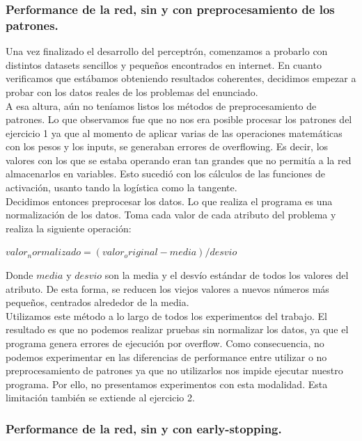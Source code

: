 \subsubsection{Performance de la red, sin y con preprocesamiento de los patrones.}

Una vez finalizado el desarrollo del perceptrón, comenzamos a probarlo con distintos datasets sencillos y pequeños encontrados en internet. En cuanto verificamos que estábamos obteniendo resultados coherentes, decidimos empezar a probar con los datos reales de los problemas del enunciado.\\

A esa altura, aún no teníamos listos los métodos de preprocesamiento de patrones. Lo que observamos fue que no nos era posible procesar los patrones del ejercicio 1 ya que al momento de aplicar varias de las operaciones matemáticas con los pesos y los inputs, se generaban errores de overflowing. Es decir, los valores con los que se estaba operando eran tan grandes que no permitía a la red almacenarlos en variables. Esto sucedió con los cálculos de las funciones de activación, usanto tando la logística como la tangente.\\

Decidimos entonces preprocesar los datos. Lo que realiza el programa es una normalización de los datos. Toma cada valor de cada atributo del problema y realiza 
la siguiente operación:\\

\begin{center}
	$valor_normalizado = (valor_original - media) / desvio$
\end{center}

Donde $media$ y $desvio$ son la media y el desvío estándar de todos los valores del atributo. De esta forma, se reducen los viejos valores a nuevos números más pequeños, centrados alrededor de la media.\\

Utilizamos este método a lo largo de todos los experimentos del trabajo. El resultado es que no podemos realizar pruebas sin normalizar los datos, ya que el programa genera errores de ejecución por overflow. Como consecuencia, no podemos experimentar en las diferencias de performance entre utilizar o no preprocesamiento de patrones ya que no utilizarlos nos impide ejecutar nuestro programa. Por ello, no presentamos experimentos con esta modalidad. Esta limitación también se extiende al ejercicio 2.

\subsubsection{Performance de la red, sin y con early-stopping.}

